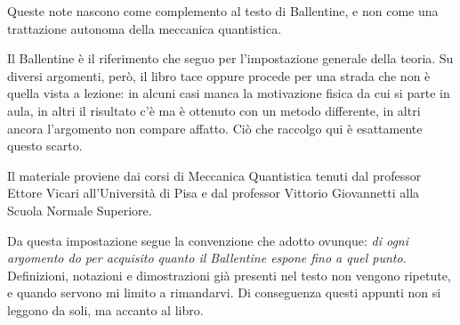 
Queste note nascono come complemento al testo di Ballentine, e non come una trattazione autonoma della meccanica quantistica.

Il Ballentine è il riferimento che seguo per l'impostazione generale della teoria. Su diversi argomenti, però, il libro tace oppure procede per una strada che non è quella vista a lezione: in alcuni casi manca la motivazione fisica da cui si parte in aula, in altri il risultato c'è ma è ottenuto con un metodo differente, in altri ancora l'argomento non compare affatto. Ciò che raccolgo qui è esattamente questo scarto.

Il materiale proviene dai corsi di Meccanica Quantistica tenuti dal professor Ettore Vicari all'Università di Pisa e dal professor Vittorio Giovannetti alla Scuola Normale Superiore.

Da questa impostazione segue la convenzione che adotto ovunque: \emph{di ogni argomento do per acquisito quanto il Ballentine espone fino a quel punto}.
Definizioni, notazioni e dimostrazioni già presenti nel testo non vengono ripetute, e quando servono mi limito a rimandarvi. Di conseguenza questi appunti non si leggono da soli, ma accanto al libro.
